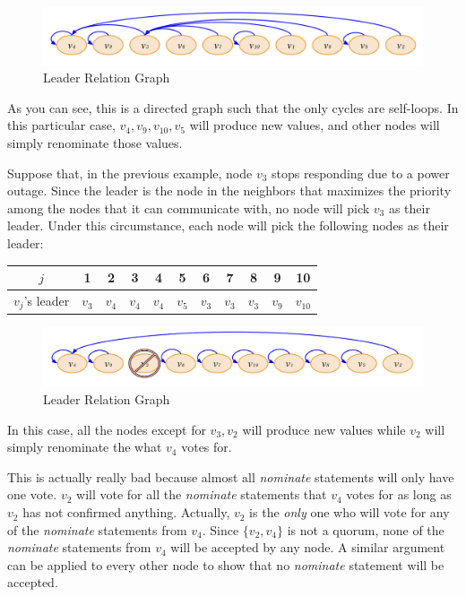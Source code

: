 \begin{exmp}
    \begin{figure}[!htb]
        \includegraphics[width=.8\linewidth]{img/leader_election.jpeg}
        \caption{Leader Relation Graph}
        \label{fig:leader_relation}
    \end{figure}

    As you can see, this is a directed graph such that the only cycles are self-loops.
    In this particular case, $v_4, v_9, v_{10}, v_5$ will produce new values, and other nodes will simply renominate those values.
\end{exmp}

\begin{exmp}
    Suppose that, in the previous example, node $v_3$ stops responding due to a power outage.
    Since the leader is the node in the neighbors that maximizes the priority among the nodes that it can communicate with, no node will pick $v_3$ as their leader.
    Under this circumstance, each node will pick the following nodes as their leader:

    \begin{center}
      \begin{tabular}{ | c | c | c | c | c | c | c | c | c | c | c | }
        \hline
            $j$ & 1 & 2 & 3 & 4 & 5 & 6 & 7 & 8 & 9 & 10 \\ \hline
            $v_j$'s leader & $v_3$ & $v_4$ & $v_4$ & $v_4$ & $v_5$ & $v_3$ & $v_3$ & $v_3$ & $v_9$ & $v_{10}$ \\
        \hline
      \end{tabular}
    \end{center}

    \begin{figure}[!htb]
        \includegraphics[width=.8\linewidth]{img/leader_election_with_failed_node.jpeg}
        \caption{Leader Relation Graph}
        \label{fig:leader_relation_with_failed_node}
    \end{figure}
    
    In this case, all the nodes except for $v_3, v_2$ will produce new values while $v_2$ will simply renominate the what $v_4$ votes for.

    This is actually really bad because almost all \textit{nominate} statements will only have one vote.
    $v_2$ will vote for all the \textit{nominate} statements that $v_4$ votes for as long as $v_2$ has not confirmed anything.
    Actually, $v_2$ is the \textit{only} one who will vote for any of the \textit{nominate} statements from $v_4$.
    Since $\{ v_2, v_4 \}$ is not a quorum, none of the \textit{nominate} statements from $v_4$ will be accepted by any node.
    A similar argument can be applied to every other node to show that no \textit{nominate} statement will be accepted.
\end{exmp}


